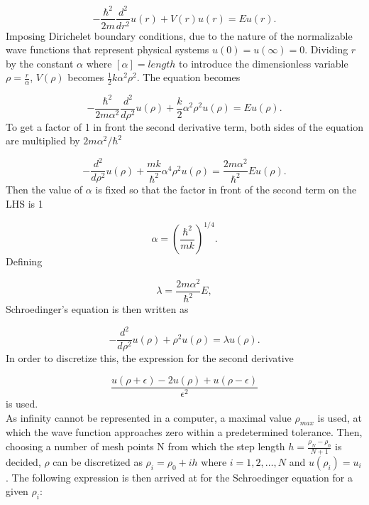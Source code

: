 \documentclass[10pt,a4paper]{article}
\begin{document}
\begin{equation*}
  -\frac{\hbar^2}{2 m} \frac{d^2}{dr^2}u(r)+ V(r) u(r) = E u(r).
\end{equation*}
Imposing Dirichelet boundary conditions, due to the nature of the normalizable wave functions that represent physical systems $u(0)=u(\infty)=0$. Dividing $r$ by the constant $\alpha$ where $[\alpha] = length$ to introduce the dimensionless variable $\rho =\frac{r}{\alpha}$, $V(\rho)$ becomes $\frac{1}{2}k\alpha^2 \rho^2$. The equation becomes

\begin{equation*}
  -\frac{\hbar^2}{2 m \alpha^2} \frac{d^2}{d\rho^2} u(\rho) 
       + \frac{k}{2} \alpha^2\rho^2u(\rho)  = E u(\rho) .
\end{equation*}
To get a factor of 1 in front the second derivative term, both sides of the equation are multiplied by $2m\alpha^2/\hbar^2$

\begin{equation*}
  -\frac{d^2}{d\rho^2} u(\rho) 
       + \frac{mk}{\hbar^2} \alpha^4\rho^2u(\rho)  = \frac{2m\alpha^2}{\hbar^2}E u(\rho) .
\end{equation*}
Then the value of $\alpha$ is fixed so that the factor in front of the second term on the LHS is 1

\begin{equation*}
\alpha = \left(\frac{\hbar^2}{mk}\right)^{1/4}.
\end{equation*}
Defining

\begin{equation*}
\lambda = \frac{2m\alpha^2}{\hbar^2}E,
\end{equation*}
Schroedinger's equation is then written as

\begin{equation*}
  -\frac{d^2}{d\rho^2} u(\rho) + \rho^2u(\rho)  = \lambda u(\rho) .
\end{equation*}
In order to discretize this, the expression for the second derivative

\begin{equation*}
  \frac{u(\rho+\epsilon) -2u(\rho) +u(\rho-\epsilon)}{\epsilon^2}
\end{equation*}
is used.\\As infinity cannot be represented in a computer, a maximal value $\rho_{max}$ is used, at which the wave function approaches zero within a predetermined tolerance. Then, choosing a number of mesh points N from which the step length $h=\frac{\rho_N-\rho_0 }{N+1}$ is decided, $\rho$ can be discretized as $\rho_i= \rho_0 + ih$ where $i=1,2,\dots , N$ and $u(\rho_i)=u_i$. The following expression is then arrived at for the Schroedinger equation for a given $\rho_i$:
\end{document}
